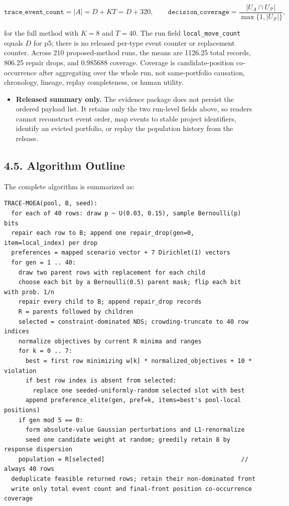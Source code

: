 \documentclass[
  10pt,
  a4paper,
]{article}
\providecommand{\tightlist}{%
  \setlength{\itemsep}{0pt}\setlength{\parskip}{0pt}}
\begin{document}
\[
\texttt{trace\_event\_count}=|A|=D+K T=D+320,
\qquad
\texttt{decision\_coverage}=\frac{|U_A\cap U_{\mathcal P}|}{\max\{1,|U_{\mathcal P}|\}},
\]

for the full method with \(K=8\) and \(T=40\). The run field
\texttt{local\_move\_count} equals \(D\) for p5; there is no released
per-type event counter or replacement counter. Across 210
proposed-method runs, the means are 1126.25 total records, 806.25 repair
drops, and 0.985688 coverage. Coverage is candidate-position
co-occurrence after aggregating over the whole run, not same-portfolio
causation, chronology, lineage, replay completeness, or human utility.

\begin{itemize}
\tightlist
\item
  \textbf{Released summary only.} The evidence package does not persist
  the ordered payload list. It retains only the two run-level fields
  above, so readers cannot reconstruct event order, map events to stable
  project identifiers, identify an evicted portfolio, or replay the
  population history from the release.
\end{itemize}

\subsection{4.5. Algorithm Outline}\label{algorithm-outline}

The complete algorithm is summarized as:

\begin{verbatim}
TRACE-MOEA(pool, B, seed):
  for each of 40 rows: draw p ~ U(0.03, 0.15), sample Bernoulli(p) bits
  repair each row to B; append one repair_drop(gen=0, item=local_index) per drop
  preferences = mapped scenario vector + 7 Dirichlet(1) vectors
  for gen = 1 .. 40:
    draw two parent rows with replacement for each child
    choose each bit by a Bernoulli(0.5) parent mask; flip each bit with prob. 1/n
    repair every child to B; append repair_drop records
    R = parents followed by children
    selected = constraint-dominated NDS; crowding-truncate to 40 row indices
    normalize objectives by current R minima and ranges
    for k = 0 .. 7:
      best = first row minimizing w[k] * normalized_objectives + 10 * violation
      if best row index is absent from selected:
        replace one seeded-uniformly-random selected slot with best
      append preference_elite(gen, pref=k, items=best's pool-local positions)
    if gen mod 5 == 0:
      form absolute-value Gaussian perturbations and L1-renormalize
      seed one candidate weight at random; greedily retain 8 by response dispersion
    population = R[selected]                                      // always 40 rows
  deduplicate feasible returned rows; retain their non-dominated front
  write only total event count and final-front position co-occurrence coverage
\end{verbatim}
\end{document}
